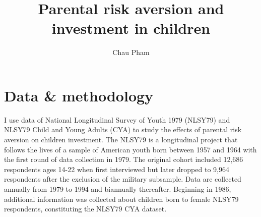 \documentclass[]{article}
\title{Parental risk aversion and investment in children}
\author{Chau Pham}
\begin{document}
\maketitle
\onehalfspacing

\section{Data \& methodology}
I use data of National Longitudinal Survey of Youth 1979 (NLSY79) and NLSY79 Child and Young Adults (CYA) to study the effects of parental risk aversion on children investment. The NLSY79 is a longitudinal project that follows the lives of a sample of American youth born between 1957 and 1964 with the first round of data collection in 1979. The original cohort included 12,686 respondents ages 14-22 when first interviewed but later dropped to 9,964 respondents after the exclusion of the military subsample. Data are collected annually from 1979 to 1994 and biannually thereafter. Beginning in 1986, additional information was collected about children born to female NLSY79 respondents, constituting the NLSY79 CYA dataset. 

\subsection{}

\begin{comment}	%
	\begin{figure}[!ht]
		\setlength{\fboxrule}{1.5pt}
		\setlength{\fboxsep}{0pt}
		\fbox{\texttt{[image: ...]}}
		\caption{...}
		\label{fig:1}
	\end{figure}
\end{comment}



\pagebreak

%
%
\end{document}
